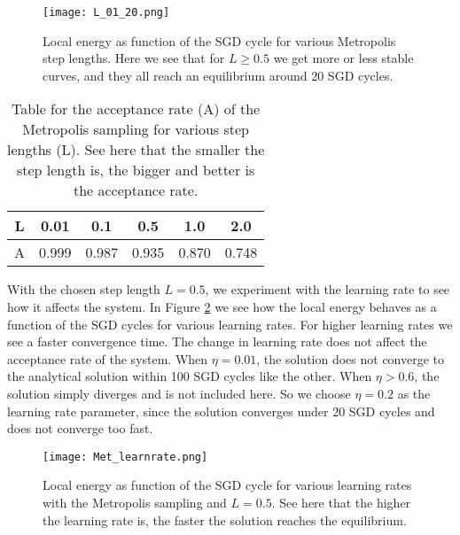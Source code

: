 \documentclass[12pt,a4paper,english]{article}
\begin{document}
\begin{figure}[htbp!]
	\centering\texttt{[image: L\_01\_20.png]}
	\caption{Local energy as function of the SGD cycle for various Metropolis step lengths. Here we see that for $L\geq0.5$ we get more or less stable curves, and they all reach an equilibrium around 20 SGD cycles. \label{fig:check_L}}
\end{figure} 

\begin{table}[htbp!]
	\centering
	\begin{tabular}{|c|c|c|c|c|c|}
		\hline \rule{0pt}{13pt}
		L & 0.01 & 0.1 & 0.5 & 1.0 & 2.0 \\
		\hline \rule{0pt}{13pt}
		A & 0.999 &  0.987 & 0.935 & 0.870 & 0.748 \\
		\hline
	\end{tabular}
	\caption{Table for the acceptance rate (A) of the Metropolis sampling for various step lengths (L). See here that the smaller the step length is, the bigger and better is the acceptance rate. \label{tab:Met_A}}
\end{table}

With the chosen step length $L=0.5$, we experiment with the learning rate to see how it affects the system. In Figure \ref{fig:check_learnrate_Met} we see how the local energy behaves as a function of the SGD cycles for various learning rates. For higher learning rates we see a faster convergence time. The change in learning rate does not affect the acceptance rate of the system. When $\eta=0.01$, the solution does not converge to the analytical solution within 100 SGD cycles like the other. When $\eta>0.6$, the solution simply diverges and is not included here. So we choose $\eta=0.2$ as the learning rate parameter, since the solution converges under 20 SGD cycles and does not converge too fast.

\begin{figure}[htbp!]
	\centering\texttt{[image: Met\_learnrate.png]}
	\caption{Local energy as function of the SGD cycle for various learning rates with the Metropolis sampling and $L=0.5$. See here that the higher the learning rate is, the faster the solution reaches the equilibrium. \label{fig:check_learnrate_Met}}
\end{figure} 
\end{document}

